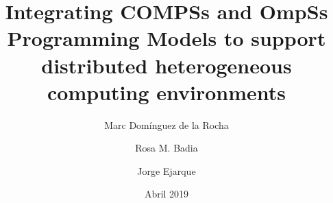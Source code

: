\documentclass[a4paper]{article}
\title{Integrating COMPSs and OmpSs Programming Models to support distributed heterogeneous computing environments}
\author
{
Marc Domínguez de la Rocha
\and
Rosa M. Badia
\and
Jorge Ejarque
}
\date{Abril 2019}
\begin{document}
\maketitle

\newpage
\renewcommand{\contentsname}{Índice}
\tableofcontents
\newpage









\nocite{*}
\end{document}
